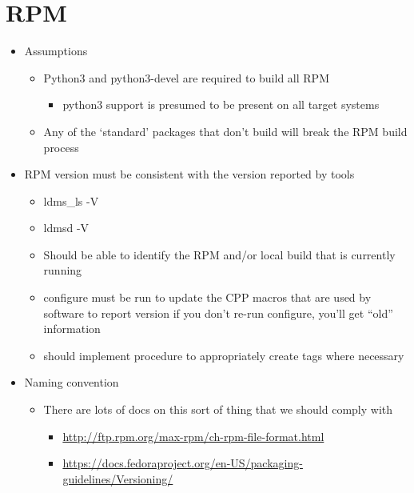 \documentclass{article}
\begin{document}
\section{RPM}
\begin{itemize}
    \item Assumptions
        \begin{itemize}
                \item Python3 and python3-devel are required to build all RPM
                \begin{itemize}
                    \item python3 support is presumed to be present on all target systems
                \end{itemize}
                \item Any of the ‘standard’ packages that don’t build will break the RPM build process
        \end{itemize}
   \item RPM version must be consistent with the version reported by tools
        \begin{itemize}
                \item ldms\_ls -V
                \item ldmsd -V
                \item Should be able to identify the RPM and/or local build that is currently running
                \item configure must be run to update the CPP macros that are used by software to report version if you don’t re-run configure, you’ll get “old” information
                \item should implement procedure to appropriately create tags where necessary
        \end{itemize}        
    \item Naming convention
        \begin{itemize}    
            \item There are lots of docs on this sort of thing that we should comply with
                \begin{itemize}
                    \item \href{http://ftp.rpm.org/max-rpm/ch-rpm-file-format.html}{http://ftp.rpm.org/max-rpm/ch-rpm-file-format.html}
                    \item \href{https://docs.fedoraproject.org/en-US/packaging-guidelines/Versioning/}{https://docs.fedoraproject.org/en-US/packaging-guidelines/Versioning/}
            \end{itemize}

\end{itemize}
\end{itemize}
\end{document}
